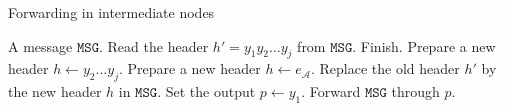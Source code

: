 \begin{algorithm}[htbp]
\caption{Forwarding in intermediate nodes}
\label{al:fwd_int}
\begin{algorithmic}[1]
	\REQUIRE A message $\texttt{MSG}$.
	\STATE Read the header $h'=y_1y_2\ldots y_j$ from $\texttt{MSG}$.
    \STATE Finish.
    \ENDIF 
    \STATE Prepare a new header $h\leftarrow y_2\ldots y_j$.
    \ELSE 
    \STATE Prepare a new header $h\leftarrow e_\mathcal{A}$.
    \ENDIF
    \STATE Replace the old header $h'$ by the new header $h$ in $\texttt{MSG}$.
    \STATE Set the output $p\leftarrow y_1$.
    \STATE Forward $\texttt{MSG}$ through $p$.
\end{algorithmic}
\end{algorithm}